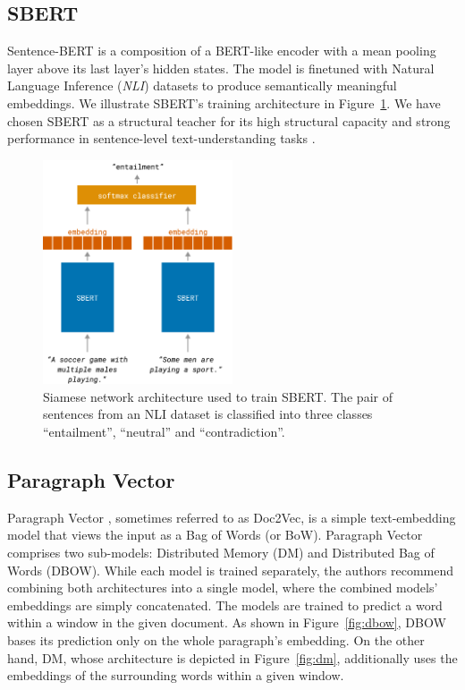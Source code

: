 \subsection{SBERT}

Sentence-BERT is a composition of a BERT-like \citep{devlin2019bert} encoder
with a mean pooling layer above its last layer's hidden states. The model is
finetuned with Natural Language Inference (\emph{NLI}) datasets to produce
semantically meaningful embeddings. We illustrate SBERT's training
architecture in Figure~\ref{fig:sbert}. We have chosen SBERT as a structural
teacher for its high structural capacity and strong performance in
sentence-level text-understanding tasks \citep{reimers2019sentence}.

\begin{figure}
  \centering
  \includegraphics[width=0.5\textwidth]{./img/sbert_architecture.pdf}

  \caption{Siamese network architecture used to train SBERT. The pair of
  sentences from an NLI dataset is classified into three classes
  ``entailment'', ``neutral'' and ``contradiction''.}

  \label{fig:sbert}

\end{figure}

\subsection{Paragraph Vector}\label{section:paragraph_vector}

Paragraph Vector \citep{le2014distributed}, sometimes referred to as Doc2Vec, is a simple
text-embedding model that views the input as a Bag of Words (or BoW). Paragraph
Vector comprises two sub-models: Distributed Memory (DM) and Distributed Bag of
Words (DBOW). While each model is trained separately, the authors recommend combining both architectures into a single model, where the combined models' embeddings are simply concatenated. The models are trained to
predict a word within a window in the given document. As shown in
Figure~\ref{fig:dbow}, DBOW bases its prediction only on the whole paragraph's embedding. On the other hand, DM, whose architecture is depicted in
Figure~\ref{fig:dm}, additionally uses the embeddings of the surrounding words
within a given window.


